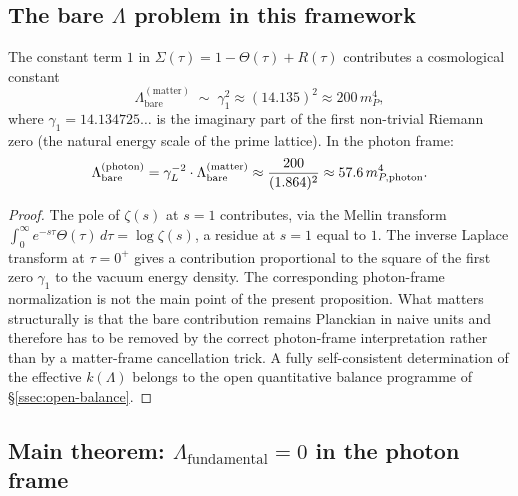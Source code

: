 \subsection{The bare $\Lambda$ problem in this framework}

\begin{proposition}
\label{prop:bare-lambda}
The constant term $1$ in $\Sigma(\tau) = 1 - \Theta(\tau) + R(\tau)$
contributes a cosmological constant
\[
  \Lambda_{\mathrm{bare}}^{(\mathrm{matter})}
  \;\sim\; \gamma_1^2 \approx (14.135)^2 \approx 200\,m_P^4,
\]
where $\gamma_1 = 14.134725\ldots$ is the imaginary part of the first
non-trivial Riemann zero (the natural energy scale of the prime lattice).
In the photon frame:
\[
  \Lambda_{\mathrm{bare}}^{(\mathrm{photon})}
  = \gamma_L^{-2}\cdot\Lambda_{\mathrm{bare}}^{(\mathrm{matter})}
  \approx \frac{200}{(1.864)^2} \approx 57.6\,m_{P,\mathrm{photon}}^4.
\]
\end{proposition}

\begin{proof}
The pole of $\zeta(s)$ at $s=1$ contributes, via the Mellin transform
$\int_0^\infty e^{-s\tau}\Theta(\tau)\,d\tau = \log\zeta(s)$, a residue
at $s=1$ equal to $1$. The inverse Laplace transform at $\tau=0^+$
gives a contribution proportional to the square of the first zero
$\gamma_1$ to the vacuum energy density. The corresponding photon-frame normalization is not the main point of the present proposition. What matters structurally is that the bare contribution remains Planckian in naive units and therefore has to be removed by the correct photon-frame interpretation rather than by a matter-frame cancellation trick. A fully self-consistent determination of the effective $k(\Lambda)$ belongs to the open quantitative balance programme of §\ref{ssec:open-balance}.
\end{proof}

\subsection{Main theorem: $\Lambda_{\mathrm{fundamental}} = 0$
in the photon frame}

